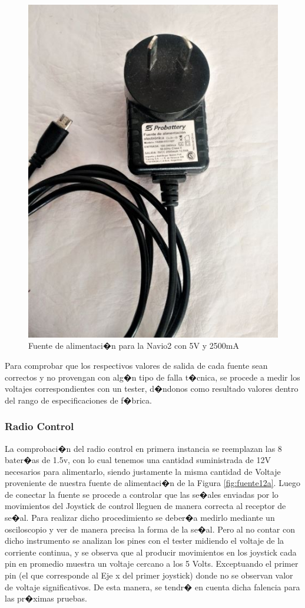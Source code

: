 \begin{itemize}
	\begin{figure}[h!]
		\centering
		\includegraphics[width=0.4\linewidth, height=0.2\textheight]{Imagenes/fuenteNavio2}
		\caption{Fuente de alimentaci�n para la Navio2 con 5V y 2500mA}
		\label{fig:fuentenavio2}
	\end{figure}
	
\end{itemize}

Para comprobar que los respectivos valores de salida de cada fuente sean correctos y no provengan con alg�n tipo de falla t�cnica, se procede a medir los voltajes correspondientes con un tester, d�ndonos como resultado valores dentro del rango de especificaciones de f�brica.



\newpage

\subsubsection{Radio Control}

La comprobaci�n del radio control en primera instancia se reemplazan las 8 bater�as de 1.5v, con lo cual  tenemos una cantidad suministrada de 12V necesarios para alimentarlo, siendo justamente la misma cantidad de Voltaje proveniente de nuestra fuente de alimentaci�n de la Figura \ref{fig:fuente12a}. Luego de conectar la fuente se procede a controlar que las se�ales enviadas por lo movimientos del Joystick de control lleguen de manera correcta al receptor de se�al. Para realizar dicho procedimiento se deber�a medirlo mediante un osciloscopio y ver de manera precisa la forma de la se�al. Pero al no contar con dicho instrumento se analizan los pines con el tester midiendo el voltaje de la corriente continua, y se observa que al producir movimientos en los joystick cada pin en promedio muestra un voltaje cercano a los 5 Volts. Exceptuando el primer pin (el que corresponde al Eje x del primer joystick) donde no se observan valor de voltaje significativos. De esta manera, se tendr� en cuenta dicha falencia para las pr�ximas pruebas.  


